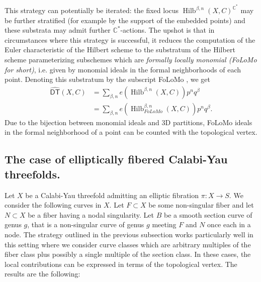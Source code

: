 \documentclass[12pt]{amsart}
\newcommand{\cnums} {{\mathbb C}}          %
\theoremstyle{definition}
\newcommand{\DThat}{\operatorname{\widehat{\mathsf{DT}}}}
\newcommand{\HilbBetan}{\operatorname{Hilb}^{\beta ,n}}
\newcommand{\folomo}{{FoLoMo }}
\begin{document}
This strategy can potentially be iterated: the fixed locus
$\HilbBetan (X,C)^{\cnums^{*}}$ may be further stratified (for example
by the support of the embedded points) and these substrata may admit
further $\cnums^{*}$-actions. The upshot is that in circumstances
where this strategy is successful, it reduces the computation of the
Euler characteristic of the Hilbert scheme to the substratum of the
Hilbert scheme parameterizing subschemes which are \emph{formally
locally monomial ({\folomo } for short)}, i.e. given by monomial
ideals in the formal neighborhoods of each point. Denoting this
substratum by the subscript \folomo, we get
\begin{align*}
\DThat (X,C)&= \sum_{\beta ,n} e\left(\HilbBetan (X,C) \right) p^{n}q^{\beta }\\
&= \sum_{\beta ,n} e\left(\HilbBetan_{\folomo } (X,C) \right) p^{n}q^{\beta }.
\end{align*}
Due to the bijection between monomial ideals and 3D partitions,
\folomo ideals in the formal neighborhood of a point can be counted
with the topological vertex.


\subsection{The case of elliptically fibered Calabi-Yau threefolds.}

Let $X$ be a Calabi-Yau threefold admitting an elliptic fibration $\pi
:X\to S$. We consider the following curves in $X$. Let $F\subset X$ be
some non-singular fiber and let $N\subset X$ be a fiber having a nodal
singularity. Let $B$ be a smooth section curve of genus $g$, that is a
non-singular curve of genus $g$ meeting $F$ and $N$ once each in a
node. The strategy outlined in the previous subsection works
particularly well in this setting where we consider curve classes
which are arbitrary multiples of the fiber class plus possibly a
single multiple of the section class. In these cases, the local
contributions can be expressed in terms of the topological vertex. The
results are the following:
\end{document}
